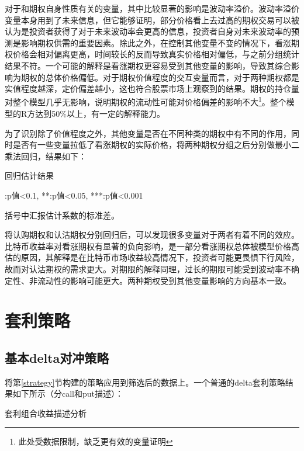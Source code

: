 \par{对于和期权自身性质有关的变量，其中比较显著的影响是波动率溢价。波动率溢价变量本身用到了未来信息，但它能够证明，部分价格看上去过高的期权交易可以被认为是投资者获得了对于未来波动率会更高的信息，投资者自身对未来波动率的预测是影响期权供需的重要因素。除此之外，在控制其他变量不变的情况下，看涨期权价格会相对偏离更高，时间较长的反而导致真实价格相对偏低，与之前分组统计结果不符。一个可能的解释是看涨期权更容易受到其他变量的影响，导致其综合影响为期权的总体价格偏低。对于期权价值程度的交互变量而言，对于两种期权都是实值程度越深，定价偏差越小，这也符合股票市场上观察到的结果。期权的持仓量对整个模型几乎无影响，说明期权的流动性可能对价格偏差的影响不大\footnote{此处受数据限制，缺乏更有效的变量证明}。整个模型的R方达到50$\%$以上，有一定的解释能力。}
\par{为了识别除了价值程度之外，其他变量是否在不同种类的期权中有不同的作用，同时是否有一些变量拉低了看涨期权的实际价格，将两种期权分组之后分别做最小二乘法回归，结果如下：}
\newpage
{}
\begin{center}
    \begin{threeparttable}[H]

        \caption{回归估计结果}

        
        \begin{tablenotes}
            \footnotesize
            \item *:p值<0.1, **:p值<0.05, ***:p值<0.001
            \item 括号中汇报估计系数的标准差。
        \end{tablenotes}
    \end{threeparttable}
\end{center}
\newpage
\restoregeometry
将认购期权和认沽期权分别回归后，可以发现很多变量对于两者有着不同的效应。比特币收益率对看涨期权有显著的负向影响，是一部分看涨期权总体被模型价格高估的原因，其解释是在比特币市场收益较高情况下，投资者可能更畏惧下行风险，故而对认沽期权的需求更大。对期限的解释同理，过长的期限可能受到波动率不确定性、非流动性的影响可能更大。两种期权受到其他变量影响的方向基本一致。
\section{套利策略}
\subsection{基本delta对冲策略}
将第\ref{strategy}节构建的策略应用到筛选后的数据上。一个普通的delta套利策略结果如下所示（分call和put描述）： 
~\\ 
\begin{table}
    \caption{套利组合收益描述分析}
    \centering
    
    
\end{table}

